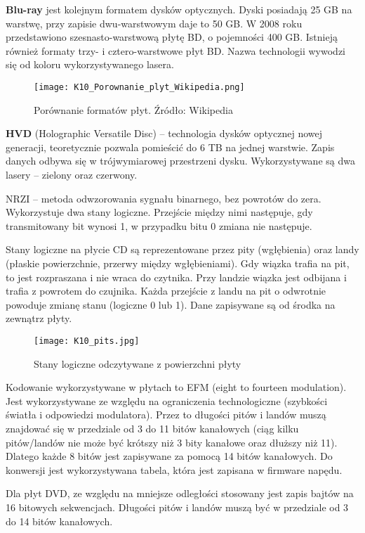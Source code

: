 \textbf{Blu-ray} jest kolejnym formatem dysków optycznych. Dyski posiadają 25 GB na warstwę, przy zapisie dwu-warstwowym daje to 50 GB. W 2008 roku przedstawiono szesnasto-warstwową płytę BD, o pojemności 400 GB. Istnieją również formaty trzy- i cztero-warstwowe płyt BD. Nazwa technologii wywodzi się od koloru wykorzystywanego lasera. 

\begin{figure}[H]
\caption{Porównanie formatów płyt. Źródło: Wikipedia}
\centering
\texttt{[image: K10\_Porownanie\_plyt\_Wikipedia.png]}
\end{figure}

\textbf{HVD} (Holographic Versatile Disc) -- technologia dysków optycznej nowej generacji, teoretycznie pozwala pomieścić do 6 TB na jednej warstwie. Zapis danych odbywa się w trójwymiarowej przestrzeni dysku. Wykorzystywane są dwa lasery -- zielony oraz czerwony.

NRZI -- metoda odwzorowania sygnału binarnego, bez powrotów do zera. Wykorzystuje dwa stany logiczne. Przejście między nimi następuje, gdy transmitowany bit wynosi 1, w przypadku bitu 0 zmiana nie następuje.

Stany logiczne na płycie CD są reprezentowane przez pity (wgłębienia) oraz landy (płaskie powierzchnie, przerwy między wgłębieniami). Gdy wiązka trafia na pit, to jest rozpraszana i nie wraca do czytnika. Przy landzie wiązka jest odbijana i trafia z powrotem do czujnika. Każda przejście z landu na pit o odwrotnie powoduje zmianę stanu (logiczne 0 lub 1). Dane zapisywane są od środka na zewnątrz płyty.

\begin{figure}[H]
\caption{Stany logiczne odczytywane z powierzchni płyty}
\centering
\texttt{[image: K10\_pits.jpg]}
\end{figure}

Kodowanie wykorzystywane w płytach to EFM (eight to fourteen modulation). Jest wykorzystywane ze względu na ograniczenia technologiczne (szybkości światła i odpowiedzi modulatora). Przez to długości pitów i landów muszą znajdować się w przedziale od 3 do 11 bitów kanałowych (ciąg kilku pitów/landów nie może być krótszy niż 3 bity kanałowe oraz dłuższy niż 11). Dlatego każde 8 bitów jest zapisywane za pomocą 14 bitów kanałowych. Do konwersji jest wykorzystywana tabela, która jest zapisana w firmware napędu. 

Dla płyt DVD, ze względu na mniejsze odległości stosowany jest zapis bajtów na 16 bitowych sekwencjach. Długości pitów i landów muszą być w przedziale od 3 do 14 bitów kanałowych.

